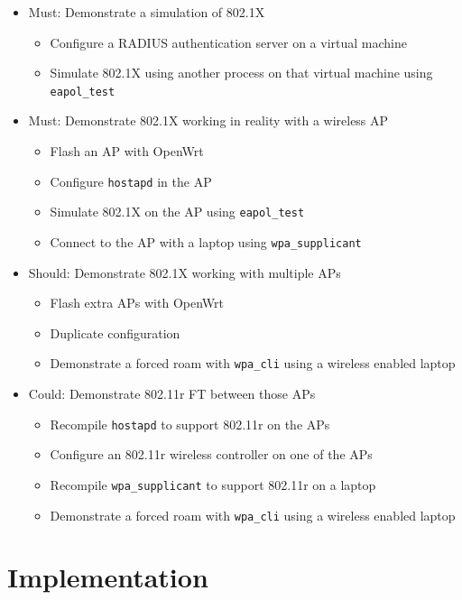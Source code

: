\documentclass[pdftex, 12pt, a4paper]{article}
\begin{document}
\begin{itemize}
    \item Must: Demonstrate a simulation of 802.1X
    \begin{itemize}
        \item Configure a RADIUS authentication server on a virtual machine
        \item Simulate 802.1X using another process on that virtual machine using \verb`eapol_test`
    \end{itemize}
    \item Must: Demonstrate 802.1X working in reality with a wireless AP
    \begin{itemize}
        \item Flash an AP with OpenWrt
        \item Configure \verb`hostapd` in the AP
        \item Simulate 802.1X on the AP using \verb`eapol_test`
        \item Connect to the AP with a laptop using \verb`wpa_supplicant`
    \end{itemize}
    \item Should: Demonstrate 802.1X working with multiple APs
    \begin{itemize}
        \item Flash extra APs with OpenWrt
        \item Duplicate configuration
        \item Demonstrate a forced roam with \verb`wpa_cli` using a wireless enabled laptop
    \end{itemize}
    \item Could: Demonstrate 802.11r FT between those APs
    \begin{itemize}
        \item Recompile \verb`hostapd` to support 802.11r on the APs
        \item Configure an 802.11r wireless controller on one of the APs
        \item Recompile \verb`wpa_supplicant` to support 802.11r on a laptop
        \item Demonstrate a forced roam with \verb`wpa_cli` using a wireless enabled laptop
    \end{itemize}
\end{itemize}

\section{Implementation}
\end{document}
